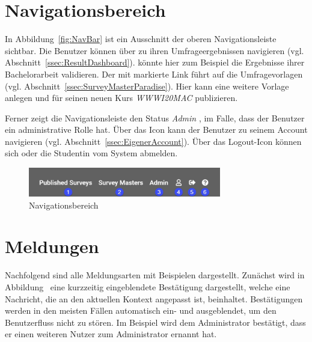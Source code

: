 \section{Navigationsbereich}
\label{ssec:NavBar}

In Abbildung~\vref{fig:NavBar} ist ein Ausschnitt der oberen Navigationsleiste sichtbar.
Die Benutzer können über \desOne zu ihren Umfrageergebnissen navigieren (vgl. Abschnitt~\vref{ssec:ResultDashboard}).
\ariane könnte hier zum Beispiel die Ergebnisse ihrer Bachelorarbeit validieren.
Der mit \desTwo markierte Link führt auf die Umfragevorlagen (vgl. Abschnitt~\vref{ssec:SurveyMasterParadise}).
Hier kann \dutzi \zb eine weitere Vorlage anlegen und für seinen neuen Kurs \emph{WWWI20MAC} publizieren.

Ferner zeigt die Navigationsleiste den Status \emph{Admin} \desThree, im Falle, dass der Benutzer ein administrative Rolle hat. \newline
Über das Icon \faUser[regular]\xspace \desFour kann der Benutzer zu seinem Account navigieren (vgl. Abschnitt~\vref{ssec:EigenerAccount}). \newline
Über \desFive das Logout-Icon \faSignOut*\xspace können sich \dutzi oder die Studentin \ariane vom System abmelden.

\begin{figure}[H]
	\centering
	\includegraphics[width=0.75\textwidth, keepaspectratio]{img/guide/NavBar.png}
	\captionsetup{justification=centering, format=plain}
	\caption[Navigationsbereich]{Navigationsbereich \\\quelleScreenshot}
	\label{fig:NavBar}
\end{figure}

\section{Meldungen}
\label{ssec:Meldungen}

Nachfolgend sind alle Meldungsarten mit Beispielen dargestellt.
Zunächst wird in Abbildung~ eine kurzzeitig eingeblendete Bestätigung dargestellt, welche eine Nachricht, die an den aktuellen Kontext angepasst ist, beinhaltet.
Bestätigungen werden in den meisten Fällen automatisch ein- und ausgeblendet, um den Benutzerfluss nicht zu stören.
Im Beispiel wird dem Administrator bestätigt, dass er einen weiteren Nutzer zum Administrator ernannt hat.

